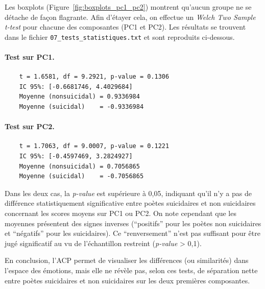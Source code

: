 \documentclass[12pt,a4paper]{article}
\begin{document}
Les boxplots (Figure~\ref{fig:boxplots_pc1_pc2}) montrent 
qu'aucun groupe ne se détache de façon flagrante. 
Afin d'étayer cela, on effectue un \textit{Welch Two Sample t-test} 
pour chacune des composantes (PC1 et PC2). 
Les résultats se trouvent dans le fichier \texttt{07\_tests\_statistiques.txt} 
et sont reproduits ci-dessous.

\paragraph{Test sur PC1.}
\begin{verbatim}
	t = 1.6581, df = 9.2921, p-value = 0.1306
	IC 95%: [-0.6681746, 4.4029684]
	Moyenne (nonsuicidal) = 0.9336984
	Moyenne (suicidal)    = -0.9336984
\end{verbatim}

\paragraph{Test sur PC2.}
\begin{verbatim}
	t = 1.7063, df = 9.0007, p-value = 0.1221
	IC 95%: [-0.4597469, 3.2824927]
	Moyenne (nonsuicidal) = 0.7056865
	Moyenne (suicidal)    = -0.7056865
\end{verbatim}

Dans les deux cas, la \textit{p-value} est supérieure à 0,05, 
indiquant qu'il n'y a pas de différence statistiquement significative 
entre poètes suicidaires et non suicidaires 
concernant les scores moyens sur PC1 ou PC2. 
On note cependant que les moyennes présentent des signes inverses 
(``positifs'' pour les poètes non suicidaires et ``négatifs'' pour les suicidaires). 
Ce ``renversement'' n’est pas suffisant pour être jugé significatif 
au vu de l’échantillon restreint (\textit{p-value} > 0,1). 

En conclusion, l’ACP permet de visualiser les différences (ou similarités) 
dans l’espace des émotions, mais elle ne révèle pas, selon ces tests, 
de séparation nette entre poètes suicidaires et non suicidaires 
sur les deux premières composantes.


	
\end{document}
